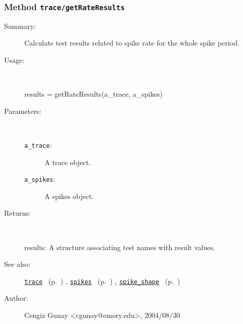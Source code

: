 \subsubsection[Method \texttt{getRateResults}]{Method \texttt{trace/getRateResults}}%
%
\label{ref_trace__getRateResults}%
\hypertarget{ref_trace__getRateResults}{}%
\begin{description}
\item[Summary:]Calculate test results related to spike rate for the
		   whole spike period.
%
\item[Usage:]~%
\begin{lyxcode}%
results = getRateResults(a\_trace, a\_spikes)
%
\end{lyxcode}%
%
%
\item[Parameters:]~
\begin{description}%
\item[\texttt{a\_trace}:]
 A trace object.
\item[\texttt{a\_spikes}:]
 A spikes object.
\end{description}%
%
\item[Returns:
]~

	results: A structure associating test names with result values.
%
%
\item[See also:]%
\hyperlink{ref_trace}{\texttt{trace}}%
\ (p.~\pageref{ref_trace})%
%
, \hyperlink{ref_spikes}{\texttt{spikes}}%
\ (p.~\pageref{ref_spikes})%
%
, \hyperlink{ref_spike_shape}{\texttt{spike\_shape}}%
\ (p.~\pageref{ref_spike_shape})%
%
%
\item[Author:]%
Cengiz Gunay <cgunay@emory.edu>, 2004/08/30
%
\end{description}
\methodline%
